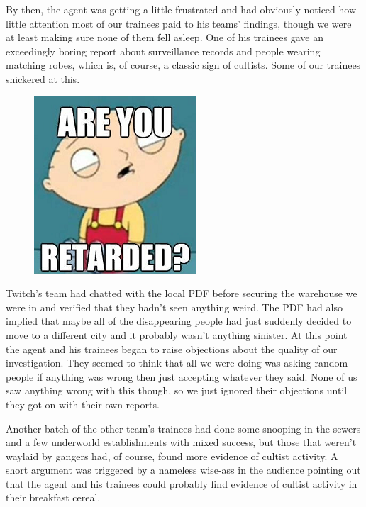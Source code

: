 By then, the agent was getting a little frustrated and had obviously noticed how little attention most of our trainees paid to his teams’ findings, though we were at least making sure none of them fell asleep. 
One of his trainees gave an exceedingly boring report about surveillance records and people wearing matching robes, which is, of course, a classic sign of cultists. 
Some of our trainees snickered at this.

\begin{figure}
	\begin{center}
		\includegraphics[width=\figwidth]{pics/8/30.png}
	\end{center}
\end{figure}
Twitch’s team had chatted with the local PDF before securing the warehouse we were in and verified that they hadn’t seen anything weird. 
The PDF had also implied that maybe all of the disappearing people had just suddenly decided to move to a different city and it probably wasn’t anything sinister. 
At this point the agent and his trainees began to raise objections about the quality of our investigation. 
They seemed to think that all we were doing was asking random people if anything was wrong then just accepting whatever they said. 
None of us saw anything wrong with this though, so we just ignored their objections until they got on with their own reports.

Another batch of the other team’s trainees had done some snooping in the sewers and a few underworld establishments with mixed success, but those that weren’t waylaid by gangers had, of course, found more evidence of cultist activity. 
A short argument was triggered by a nameless wise-ass in the audience pointing out that the agent and his trainees could probably find evidence of cultist activity in their breakfast cereal. 


